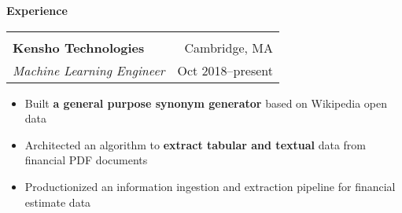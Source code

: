 \documentclass[letterpaper,11pt,oneside]{article}
\begin{document}
 \vspace{-0.35cm}
 \raggedright
 \textbf{\Large{Experience}} \sout{\hfill} \\
 \normalsize  
\begin{flushleft}
 \vspace{-0.45cm}
 \begin{tabular}{@{} l r@{} }
    \hspace{0.78\linewidth} & \hspace{0.2\linewidth} \\
    \textbf{Kensho Technologies} & Cambridge, MA \\ 
    \textit{Machine Learning Engineer} & Oct 2018--present \\ 
 \end{tabular}
 \end{flushleft}
 \begin{flushleft}
 \begin{small}
 \begin{itemize}[leftmargin=*]
 \item Built \textbf{a general purpose synonym generator} based on Wikipedia open data
 \item Architected an algorithm to \textbf{extract tabular and textual} data from financial PDF documents
 \item Productionized an information ingestion and extraction pipeline for financial estimate data
 \end{itemize}
 \end{small}
 \end{flushleft}
\end{document}
